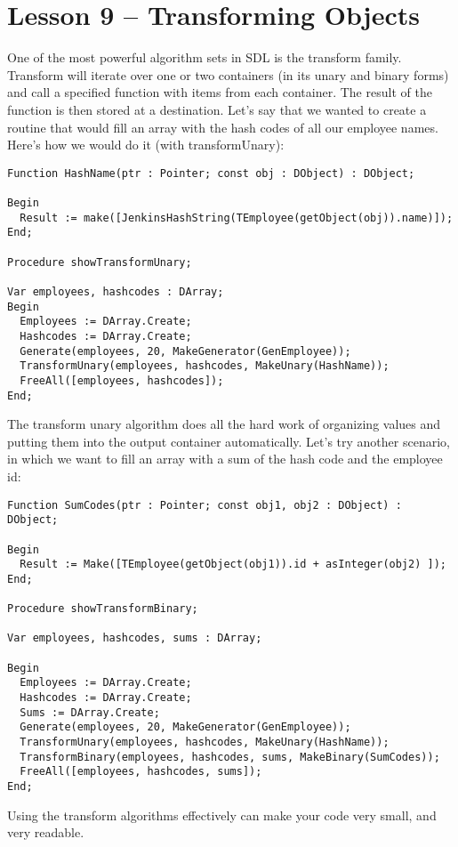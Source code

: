 \documentclass{report}
\begin{document}
\section{Lesson 9 -- Transforming Objects}

One of the most powerful algorithm sets in SDL is the transform family.
Transform will iterate over one or two containers (in its unary and binary
forms) and call a specified function with items from each container. The
result of the function is then stored at a destination. Let's say that we
wanted to create a routine that would fill an array with the hash codes of
all our employee names. Here's how we would do it (with transformUnary):

\begin{lstlisting}
Function HashName(ptr : Pointer; const obj : DObject) : DObject;

Begin
  Result := make([JenkinsHashString(TEmployee(getObject(obj)).name)]);
End;

Procedure showTransformUnary;

Var employees, hashcodes : DArray;
Begin
  Employees := DArray.Create;
  Hashcodes := DArray.Create;
  Generate(employees, 20, MakeGenerator(GenEmployee));
  TransformUnary(employees, hashcodes, MakeUnary(HashName));
  FreeAll([employees, hashcodes]);
End;
\end{lstlisting}

The transform unary algorithm does all the hard work 
of organizing values and putting them
into the output container automatically. Let's try another 
scenario, in which we want to fill
an array with a sum of the hash code and the employee id:

\begin{lstlisting}
Function SumCodes(ptr : Pointer; const obj1, obj2 : DObject) : DObject;

Begin
  Result := Make([TEmployee(getObject(obj1)).id + asInteger(obj2) ]);
End;

Procedure showTransformBinary;

Var employees, hashcodes, sums : DArray;

Begin
  Employees := DArray.Create;
  Hashcodes := DArray.Create;
  Sums := DArray.Create;
  Generate(employees, 20, MakeGenerator(GenEmployee));
  TransformUnary(employees, hashcodes, MakeUnary(HashName));
  TransformBinary(employees, hashcodes, sums, MakeBinary(SumCodes));
  FreeAll([employees, hashcodes, sums]);
End;
\end{lstlisting}

Using the transform algorithms effectively can make your 
code very small, and very readable.
\end{document}
